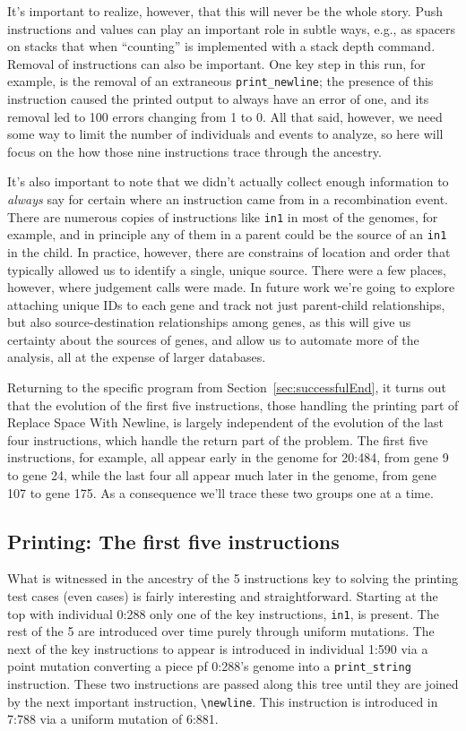 It's important to realize, however, that this will
never be the whole story. Push instructions and values can play an 
important role in subtle ways, e.g., as spacers on stacks that when
``counting'' is implemented with a stack depth command. Removal of
instructions can also be important. One key step in this run, for example, 
is the removal of an extraneous \texttt{print\_newline}; the presence of this
instruction caused the printed output to always have an error of one,
and its removal led to 100 errors changing
from 1 to 0. All that said, however, we need some way to limit the number
of individuals and events to analyze, so here will focus on the how those
nine instructions trace through the ancestry.

It's also important to note that we didn't actually collect enough information
to \emph{always} say for certain where an instruction came from in a 
recombination event. There are numerous copies of instructions like
\texttt{in1} in most of the genomes, for example, and in principle any of them
in a parent could be the source of an \texttt{in1} in the child. In practice,
however, there are constrains of location and order that typically allowed
us to identify a single, unique source. There were a few places, however, where
judgement calls were made. In future work we're going to explore attaching
unique IDs to each gene and track not just parent-child relationships, but
also source-destination relationships among genes, as this will give us
certainty about the sources of genes, and allow us to automate more of the
analysis, all at the expense of larger databases.

Returning to the specific program from Section~\ref{sec:successfulEnd},
it turns
out that the evolution of the first five instructions, those handling the
printing part of Replace Space With Newline, is largely independent of
the evolution of the last four instructions, which handle the return part
of the problem. The first five instructions, for example, all appear early 
in the genome for 20:484, from gene 9 to gene 24, while the last four 
all appear much later in the genome, from gene 107 to gene 175. As a consequence
we'll trace these two groups one at a time.

\subsection{Printing: The first five instructions}
\label{sec:Printing}

What is witnessed in the ancestry of the 5 instructions key to solving the printing test
cases (even cases) is fairly interesting and straightforward. Starting at the top with individual 0:288 only
one of the key instructions, \texttt{in1}, is present. The rest of the 5 are introduced over time purely
through uniform mutations. The next of the key instructions to appear is introduced in individual 1:590 via a point
mutation converting a piece pf 0:288's genome into a \texttt{print\_string} instruction. These two
instructions are passed along this tree until they are joined by the next important instruction,
\texttt{\textbackslash newline}. This instruction is introduced in 7:788 via a uniform mutation
of 6:881.

